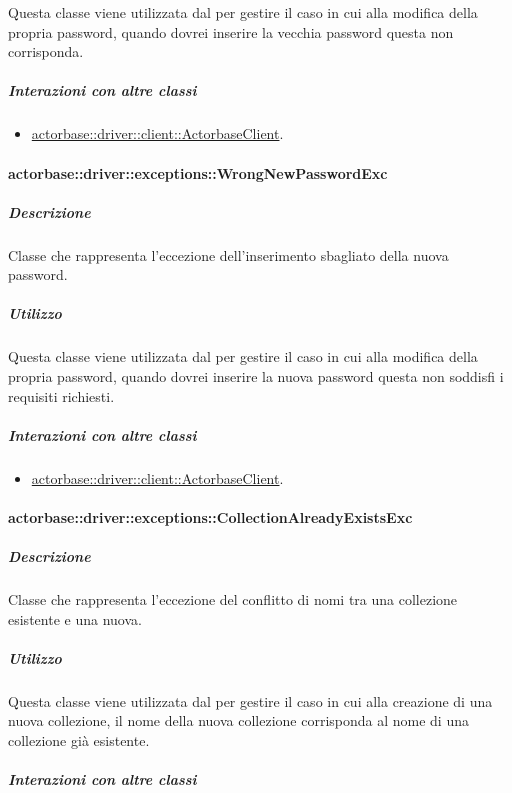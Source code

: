 \documentclass{scalatekids-article}
\begin{document}
Questa classe viene utilizzata dal  per gestire il caso in cui alla modifica della propria password, quando dovrei inserire la vecchia password questa non corrisponda.

\subparagraph{Interazioni con altre classi}

\begin{itemize}
\item \hyperref[sec:actorbase::driver::client::ActorbaseClient]{actorbase::driver::client::ActorbaseClient}.
\end{itemize}

\paragraph{actorbase::driver::exceptions::WrongNewPasswordExc}

\subparagraph{Descrizione}

Classe che rappresenta l'eccezione dell'inserimento sbagliato della nuova password.

\subparagraph{Utilizzo}

Questa classe viene utilizzata dal  per gestire il caso in cui alla modifica della propria password, quando dovrei inserire la nuova password questa non soddisfi i requisiti richiesti.

\subparagraph{Interazioni con altre classi}

\begin{itemize}
\item \hyperref[sec:actorbase::driver::client::ActorbaseClient]{actorbase::driver::client::ActorbaseClient}.
\end{itemize}

\paragraph{actorbase::driver::exceptions::CollectionAlreadyExistsExc}

\subparagraph{Descrizione}

Classe che rappresenta l'eccezione del conflitto di nomi tra una collezione esistente e una nuova.

\subparagraph{Utilizzo}

Questa classe viene utilizzata dal  per gestire il caso in cui alla creazione di una nuova collezione, il nome della nuova collezione corrisponda al nome di una collezione già esistente.

\subparagraph{Interazioni con altre classi}
\end{document}

